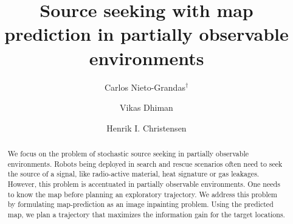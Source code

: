 \documentclass[sigconf]{aamas} %
\title{
  Source seeking with map prediction in partially observable environments
}
\author{Carlos Nieto-Grandas$^\dagger$}
\author{Vikas Dhiman}%
\author{Henrik I. Christensen}%
\affiliation{%
  \institution{University of California, San Diego}
  \city{$^\dagger$US Army Research Laboratory}
  \postcode{92121}}
\begin{document}
 


\begin{abstract}
We focus on the problem of stochastic source seeking in partially observable
environments.
Robots being deployed in search and rescue scenarios often need to
seek the source of a signal, like radio-active material, heat signature or gas leakages.
However, this problem is accentuated in partially observable
environments.
One needs to know the map before planning an exploratory trajectory.
We address this problem by formulating map-prediction as an image inpainting
problem.
Using the predicted map, we plan a trajectory that maximizes the information
gain for the target locations.
\end{abstract}

\maketitle

%



%
\end{document}
